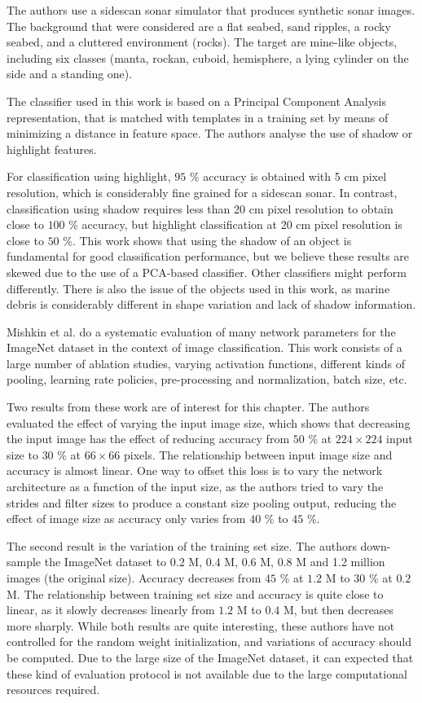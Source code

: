 The authors use a sidescan sonar simulator that produces synthetic sonar images. The background that were considered are a flat seabed, sand ripples, a rocky seabed, and a cluttered environment (rocks). The target are mine-like objects, including six classes (manta, rockan, cuboid, hemisphere, a lying cylinder on the side and a standing one).

The classifier used in this work is based on a Principal Component Analysis representation, that is matched with templates in a training set by means of minimizing a distance in feature space. The authors analyse the use of shadow or highlight features.

For classification using highlight, $95$ \% accuracy is obtained with 5 cm pixel resolution, which is considerably fine grained for a sidescan sonar. In contrast, classification using shadow requires less than 20 cm pixel resolution to obtain close to $100$ \% accuracy, but highlight classification at 20 cm pixel resolution is close to $50$ \%.
This work shows that using the shadow of an object is fundamental for good classification performance, but we believe these results are skewed due to the use of a PCA-based classifier. Other classifiers might perform differently. There is also the issue of the objects used in this work, as marine debris is considerably different in shape variation and lack of shadow information.

Mishkin et al. \cite{mishkin2016systematic} do a systematic evaluation of many network parameters for the ImageNet dataset in the context of image classification. This work consists of a large number of ablation studies, varying activation functions, different kinds of pooling, learning rate policies, pre-processing and normalization, batch size, etc.

Two results from these work are of interest for this chapter. The authors evaluated the effect of varying the input image size, which shows that decreasing the input image has the effect of reducing accuracy from $50$ \% at $224 \times 224$ input size to $30$ \% at $66 \times 66$ pixels. The relationship between input image size and accuracy is almost linear.
One way to offset this loss is to vary the network architecture as a function of the input size, as the authors tried to vary the strides and filter sizes to produce a constant size pooling output, reducing the effect of image size as accuracy only varies from $40$ \% to $45$ \%.

The second result is the variation of the training set size. The authors down-sample the ImageNet dataset to $0.2$ M, $0.4$ M, $0.6$ M, $0.8$ M and 1.2 million images (the original size). Accuracy decreases from $45$ \% at $1.2$ M to $30$ \% at $0.2$ M. The relationship between training set size and accuracy is quite close to linear, as it slowly decreases linearly from $1.2$ M to $0.4$ M, but then decreases more sharply.
While both results are quite interesting, these authors have not controlled for the random weight initialization, and variations of accuracy should be computed. Due to the large size of the ImageNet dataset, it can expected that these kind of evaluation protocol is not available due to the large computational resources required.

